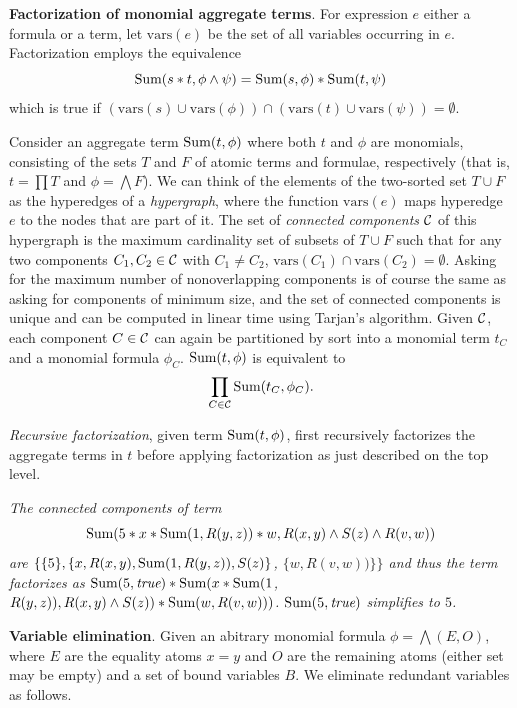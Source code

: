 \def\vars{\mbox{vars}}

{\bf Factorization of monomial aggregate terms}.
For expression $e$ either a formula or a term, let $\vars(e)$
be the set of all variables occurring in $e$.
Factorization employs the equivalence
\[
\mbox{Sum}(s*t, \phi \land \psi) = \mbox{Sum}(s, \phi) * \mbox{Sum}(t, \psi)
\]
which is true if
$(\vars(s) \cup \vars(\phi)) \cap (\vars(t) \cup \vars(\psi)) = \emptyset$.

Consider an aggregate term $\mbox{Sum}(t, \phi)$ where both $t$ and $\phi$ are
monomials, consisting of the sets $T$ and $F$ of atomic terms and formulae,
respectively (that is, $t = \prod T$ and $\phi = \bigwedge F$).
We can think of the
elements of the two-sorted set $T \cup F$ as the hyperedges of a
{\em hypergraph},
where the function $\vars(e)$ maps hyperedge $e$ to the nodes that are
part of it.
The set of {\em connected components} ${\cal C}$ of this hypergraph is the
maximum cardinality set of subsets of $T \cup F$ such that for any
two components $C_1, C_2 \in {\cal C}$ with $C_1 \neq C_2$,
$\vars(C_1) \cap \vars(C_2) = \emptyset$. Asking for the maximum number of
nonoverlapping components is of course the same as asking for components of
minimum size, and the set of connected components is unique and can be computed
in linear time using Tarjan's algorithm. Given ${\cal C}$, each component
$C \in {\cal C}$ can again be partitioned by sort into a monomial term $t_C$
and a monomial formula $\phi_C$.
%
%
$\mbox{Sum}(t, \phi)$ is equivalent to
\[
\prod_{C \in {\cal C}} \AggSum(t_C, \phi_C).
\]

{\em Recursive factorization}, given term $\mbox{Sum}(t, \phi)$, first recursively
factorizes the aggregate terms in $t$ before applying factorization as
just described on the top level.


\begin{example}\em
The connected components of term
\[
\mbox{Sum}(5 * x * \mbox{Sum}(1, R(y, z)) * w, R(x,y) \land S(z) \land R(v, w))
\]
are
$\{ \{5\}, \{ x, R(x,y), \mbox{Sum}(1, R(y, z)), S(z) \}$,
$\{ w, R(v, w)) \} \}$
and thus the term factorizes as
$\mbox{Sum}(5, \textit{true}) *
\mbox{Sum}(x * \mbox{Sum}(1$, $R(y, z)), R(x, y) \land S(z)) *
\mbox{Sum}(w, R(v, w)))$.
$\mbox{Sum}(5, \textit{true})$ simplifies to $5$.
\punto
\end{example}


{\bf Variable elimination}.
Given an abitrary monomial formula $\phi = \bigwedge (E, O)$,
where $E$ are the equality
atoms $x=y$ and $O$ are the remaining atoms (either set may be empty) and
a set of bound variables $B$.
We eliminate redundant variables as follows.

